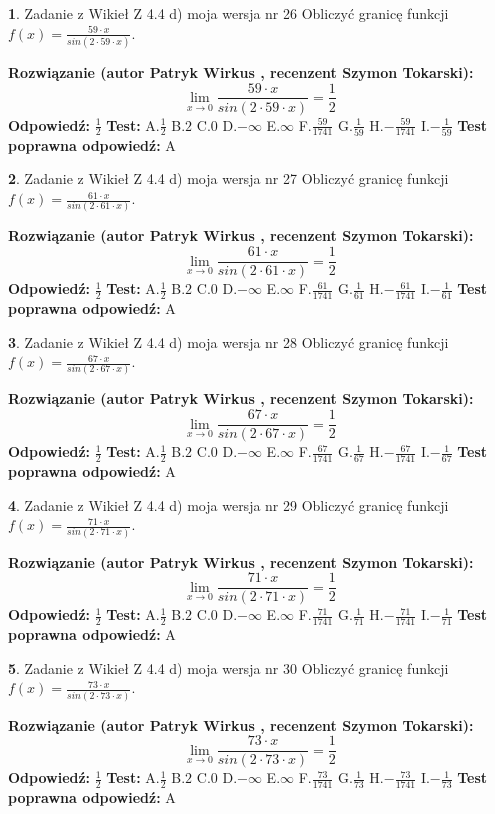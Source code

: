 \documentclass[12pt, a4paper]{article}
\theoremstyle{definition} %
\newtheorem{zad}{}
\newcommand{\zadStart}[1]{\begin{zad}#1\newline}
\newcommand{\zadStop}{\end{zad}}
\newcommand{\rozwStart}[2]{\noindent \textbf{Rozwiązanie (autor #1 , recenzent #2): }\newline}
\newcommand{\rozwStop}{\newline}
\newcommand{\odpStart}{\noindent \textbf{Odpowiedź:}\newline}
\newcommand{\odpStop}{\newline}
\newcommand{\testStart}{\noindent \textbf{Test:}\newline}
\newcommand{\testStop}{\newline}
\newcommand{\kluczStart}{\noindent \textbf{Test poprawna odpowiedź:}\newline}
\newcommand{\kluczStop}{\newline}
\begin{document}
\zadStart{Zadanie z Wikieł Z 4.4 d) moja wersja nr 26}
Obliczyć granicę funkcji $f(x)=\frac{59\cdot x}{sin(2 \cdot59\cdot x)}$.
\zadStop
\rozwStart{Patryk Wirkus}{Szymon Tokarski}
$$\lim\limits_{x\to 0}\frac{59\cdot x}{sin(2 \cdot59\cdot x)}=\frac{1}{2}$$
\rozwStop
\odpStart
$\frac{1}{2}$
\odpStop
\testStart
A.$\frac{1}{2}$
B.$2$
C.$0$
D.$-\infty$
E.$\infty$
F.$\frac{59}{1741}$
G.$\frac{1}{59}$
H.$-\frac{59}{1741}$
I.$-\frac{1}{59}$
\testStop
\kluczStart
A
\kluczStop



\zadStart{Zadanie z Wikieł Z 4.4 d) moja wersja nr 27}
Obliczyć granicę funkcji $f(x)=\frac{61\cdot x}{sin(2 \cdot61\cdot x)}$.
\zadStop
\rozwStart{Patryk Wirkus}{Szymon Tokarski}
$$\lim\limits_{x\to 0}\frac{61\cdot x}{sin(2 \cdot61\cdot x)}=\frac{1}{2}$$
\rozwStop
\odpStart
$\frac{1}{2}$
\odpStop
\testStart
A.$\frac{1}{2}$
B.$2$
C.$0$
D.$-\infty$
E.$\infty$
F.$\frac{61}{1741}$
G.$\frac{1}{61}$
H.$-\frac{61}{1741}$
I.$-\frac{1}{61}$
\testStop
\kluczStart
A
\kluczStop



\zadStart{Zadanie z Wikieł Z 4.4 d) moja wersja nr 28}
Obliczyć granicę funkcji $f(x)=\frac{67\cdot x}{sin(2 \cdot67\cdot x)}$.
\zadStop
\rozwStart{Patryk Wirkus}{Szymon Tokarski}
$$\lim\limits_{x\to 0}\frac{67\cdot x}{sin(2 \cdot67\cdot x)}=\frac{1}{2}$$
\rozwStop
\odpStart
$\frac{1}{2}$
\odpStop
\testStart
A.$\frac{1}{2}$
B.$2$
C.$0$
D.$-\infty$
E.$\infty$
F.$\frac{67}{1741}$
G.$\frac{1}{67}$
H.$-\frac{67}{1741}$
I.$-\frac{1}{67}$
\testStop
\kluczStart
A
\kluczStop



\zadStart{Zadanie z Wikieł Z 4.4 d) moja wersja nr 29}
Obliczyć granicę funkcji $f(x)=\frac{71\cdot x}{sin(2 \cdot71\cdot x)}$.
\zadStop
\rozwStart{Patryk Wirkus}{Szymon Tokarski}
$$\lim\limits_{x\to 0}\frac{71\cdot x}{sin(2 \cdot71\cdot x)}=\frac{1}{2}$$
\rozwStop
\odpStart
$\frac{1}{2}$
\odpStop
\testStart
A.$\frac{1}{2}$
B.$2$
C.$0$
D.$-\infty$
E.$\infty$
F.$\frac{71}{1741}$
G.$\frac{1}{71}$
H.$-\frac{71}{1741}$
I.$-\frac{1}{71}$
\testStop
\kluczStart
A
\kluczStop



\zadStart{Zadanie z Wikieł Z 4.4 d) moja wersja nr 30}
Obliczyć granicę funkcji $f(x)=\frac{73\cdot x}{sin(2 \cdot73\cdot x)}$.
\zadStop
\rozwStart{Patryk Wirkus}{Szymon Tokarski}
$$\lim\limits_{x\to 0}\frac{73\cdot x}{sin(2 \cdot73\cdot x)}=\frac{1}{2}$$
\rozwStop
\odpStart
$\frac{1}{2}$
\odpStop
\testStart
A.$\frac{1}{2}$
B.$2$
C.$0$
D.$-\infty$
E.$\infty$
F.$\frac{73}{1741}$
G.$\frac{1}{73}$
H.$-\frac{73}{1741}$
I.$-\frac{1}{73}$
\testStop
\kluczStart
A
\kluczStop
\end{document}
